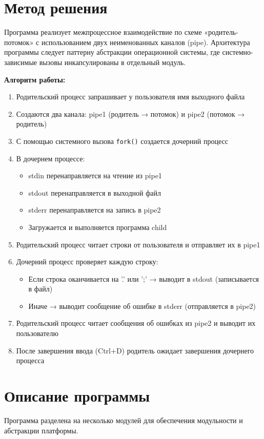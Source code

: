\section{Метод решения}
Программа реализует межпроцессное взаимодействие по схеме «родитель-потомок» с использованием двух неименованных каналов (pipe). Архитектура программы следует паттерну абстракции операционной системы, где системно-зависимые вызовы инкапсулированы в отдельный модуль.

{\bfseries Алгоритм работы:}
\begin{enumerate}
    \item Родительский процесс запрашивает у пользователя имя выходного файла
    \item Создаются два канала: pipe1 (родитель → потомок) и pipe2 (потомок → родитель)
    \item С помощью системного вызова \texttt{fork()} создается дочерний процесс
    \item В дочернем процессе:
    \begin{itemize}
        \item stdin перенаправляется на чтение из pipe1
        \item stdout перенаправляется в выходной файл
        \item stderr перенаправляется на запись в pipe2
        \item Загружается и выполняется программа child
    \end{itemize}
    \item Родительский процесс читает строки от пользователя и отправляет их в pipe1
    \item Дочерний процесс проверяет каждую строку:
    \begin{itemize}
        \item Если строка оканчивается на '.' или ';' → выводит в stdout (записывается в файл)
        \item Иначе → выводит сообщение об ошибке в stderr (отправляется в pipe2)
    \end{itemize}
    \item Родительский процесс читает сообщения об ошибках из pipe2 и выводит их пользователю
    \item После завершения ввода (Ctrl+D) родитель ожидает завершения дочернего процесса
\end{enumerate}

\section{Описание программы}
Программа разделена на несколько модулей для обеспечения модульности и абстракции платформы.

